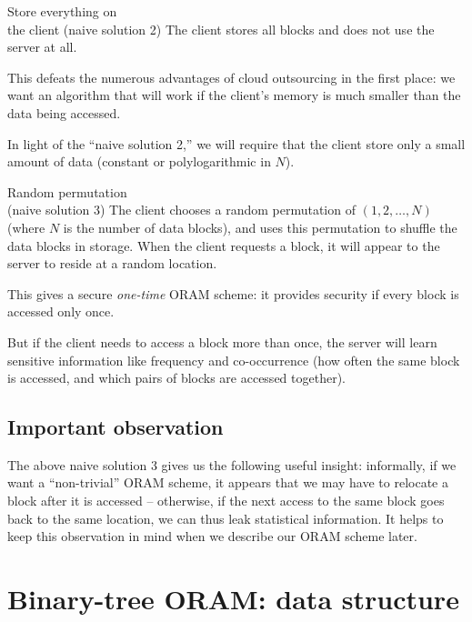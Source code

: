 \begin{algo}{Store everything on \\ the client (naive solution 2)}{}
The client stores all blocks and does not use the server at all.

This defeats the numerous advantages of cloud outsourcing in the first
place: we want an algorithm that will work if the client's memory
is much smaller than the data being accessed.
\end{algo}

In light of the ``naive solution 2,'' we will require that the client store only a small amount of data (constant or polylogarithmic in $N$).

\begin{algo}{Random permutation \\ (naive solution 3)}{}
\label{naive3}
The client chooses a random permutation of $(1, 2, \ldots, N)$ (where $N$ is the number of data blocks),
and uses this permutation to shuffle the data blocks in storage.
When the client requests
a block, it will appear to the server to reside at a random
location.

This gives a secure \emph{one-time} ORAM scheme:
it provides security if every block is accessed only once.

But if the client needs to access a block more than once,
the server will learn sensitive information like frequency and co-occurrence
(how often the same block is accessed,
and which pairs of blocks are accessed together).
\end{algo}

\subsection{Important observation}\label{important-observation.}

The above naive solution 3 gives us the following useful insight:
informally, if we want a ``non-trivial'' ORAM scheme, it appears that we
may have to relocate a block after it is accessed -- otherwise, if the
next access to the same block goes back to the same location, we can
thus leak statistical information. It helps to keep this observation in
mind when we describe our ORAM scheme later.

\section{Binary-tree ORAM: data structure}\label{data-structure}

